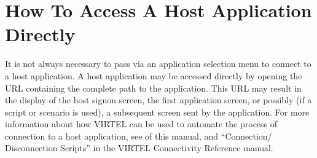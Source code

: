 \documentclass[letterpaper,10pt,english]{sphinxmanual}
\begin{document}
\begin{sphinxVerbatim}[commandchars=\\\{\}]
                         
                         
                      
                             
                                          
                                
                                

                                                
\end{sphinxVerbatim}



\section{How To Access A Host Application Directly}
\label{\detokenize{User_Guide:how-to-access-a-host-application-directly}}
It is not always necessary to pass via an application selection menu to connect to a host application. A host application
may be accessed directly by opening the URL containing the complete path to the application. This URL may result in
the display of the host signon screen, the first application screen, or possibly (if a script or scenario is used), a
subsequent screen sent by the application. For more information about how VIRTEL can be used to automate the
process of connection to a host application, see {\hyperref[\detokenize{User_Guide:v457ug-url-formats}]{}} of this manual, and “Connection/
Disconnection Scripts” in the VIRTEL Connectivity Reference manual.
\end{document}

